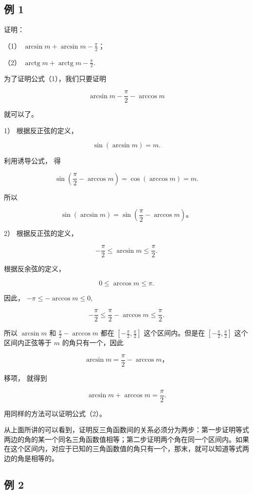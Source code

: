\subsection{例 1}

证明：

（1） \(\arcsin m + \arcsin m - \frac{\pi}{2}\)；

（2）
\(\operatorname{arctg} m + \operatorname{arctg} m - \frac{\pi}{2}\).

 为了证明公式（1），我们只要证明

\[
\arcsin m - \frac {\pi}{2} - \arccos m
\]

就可以了。

1） 根据反正弦的定义，

\[
\sin (\arcsin m) = m.
\]

利用诱导公式， 得

\[
\sin \left(\frac {\pi}{2} - \arccos m\right) = \cos (\arccos m) = m.
\]

所以

\[
\sin (\arcsin m) = \sin \left(\frac {\pi}{2} - \arccos m\right)\text{。}
\]

2） 根据反正弦的定义，

\[
- \frac {\pi}{2} \leqslant \arcsin m \leqslant \frac {\pi}{2}.
\]

根据反余弦的定义，

\[
0 \leqslant \arccos m \leqslant \pi .
\]

因此， \(-\pi \leqslant -\arccos m \leqslant 0,\)

\[
- \frac {\pi}{2} \leqslant \frac {\pi}{2} - \arccos m \leqslant \frac {\pi}{2}.
\]

所以 \(\arcsin m\) 和 \(\frac{\pi}{2} - \arccos m\) 都在
\(\left[-\frac{\pi}{2}, \frac{\pi}{2}\right]\) 这个区间内。但是在
\(\left[-\frac{\pi}{2}, \frac{\pi}{2}\right]\) 这个区间内正弦等于 \(m\)
的角只有一个，因此

\[
\arcsin m = \frac {\pi}{2} - \arccos m\text{，}
\]

移项， 就得到

\[
\arcsin m + \arccos m = \frac {\pi}{2}.
\]

用同样的方法可以证明公式（2）。

从上面所讲的可以看到，证明反三角函数间的关系必须分为两步：第一步证明等式两边的角的某一个同名三角函数值相等；第二步证明两个角在同一个区间内。如果在这个区间内，对应于已知的三角函数值的角只有一个，那末，就可以知道等式两边的角是相等的。

\subsection{例 2}

